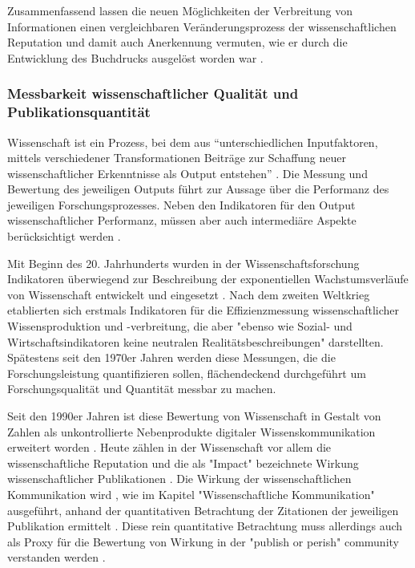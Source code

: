 Zusammenfassend lassen die neuen Möglichkeiten der Verbreitung von Informationen einen vergleichbaren Veränderungsprozess der wissenschaftlichen Reputation und damit auch Anerkennung vermuten, wie er durch die Entwicklung des Buchdrucks ausgelöst worden war \cite{hanekop_2006}.

\subsubsection{Messbarkeit wissenschaftlicher Qualität und Publikationsquantität}

Wissenschaft ist ein Prozess, bei dem aus “unterschiedlichen Inputfaktoren, mittels verschiedener Transformationen Beiträge zur Schaffung neuer wissenschaftlicher Erkenntnisse als Output entstehen” \cite{Jansen_2007}. Die Messung und Bewertung des jeweiligen Outputs führt zur Aussage über die Performanz des jeweiligen Forschungsprozesses. Neben den Indikatoren für den Output wissenschaftlicher Performanz, müssen aber auch intermediäre Aspekte berücksichtigt werden \cite{schmoch_2009}.

Mit Beginn des 20. Jahrhunderts wurden in der Wissenschaftsforschung Indikatoren überwiegend zur Beschreibung der exponentiellen Wachstumsverläufe von Wissenschaft entwickelt und eingesetzt \cite{Hornbostel_1997}. Nach dem zweiten Weltkrieg etablierten sich erstmals Indikatoren für die Effizienzmessung wissenschaftlicher Wissensproduktion und -verbreitung, die aber "ebenso wie Sozial- und Wirtschaftsindikatoren keine neutralen Realitätsbeschreibungen" \cite{Hornbostel_1997} darstellten. Spätestens seit den 1970er Jahren werden diese Messungen, die die Forschungsleistung quantifizieren sollen, flächendeckend durchgeführt \cite{Hornbostel_1997} um Forschungsqualität und Quantität messbar zu machen.

Seit den 1990er Jahren ist diese Bewertung von Wissenschaft in Gestalt von Zahlen als unkontrollierte Nebenprodukte digitaler Wissenskommunikation erweitert worden \cite{angermueller_2010}. Heute zählen in der Wissenschaft vor allem die wissenschaftliche Reputation und die als "Impact" bezeichnete Wirkung wissenschaftlicher Publikationen \cite{herb_open_2013} \cite{Hornbostel_1997}. Die Wirkung der wissenschaftlichen Kommunikation wird , wie im Kapitel "Wissenschaftliche Kommunikation" ausgeführt, anhand der quantitativen Betrachtung der Zitationen der jeweiligen Publikation ermittelt \cite{Brembs_2013} \cite[:16]{haustein_2012_multidimensional} \cite{weller2011twitter}. Diese rein quantitative Betrachtung muss allerdings auch als Proxy für die Bewertung von Wirkung in der "publish or perish" community verstanden werden \cite{peters_2015_research}.

